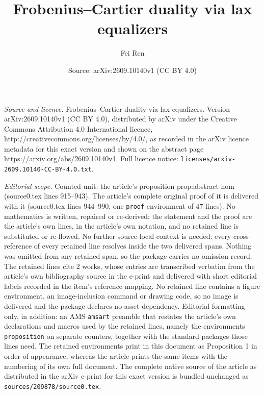 \documentclass[10pt,a4paper]{amsart}
\title{Frobenius--Cartier duality via lax equalizers}
\author{Fei Ren}
\date{Source: arXiv:2609.10140v1 (CC BY 4.0)}
\begin{document}
\maketitle

\noindent\emph{Source and licence.} Frobenius--Cartier duality via lax equalizers. Version arXiv:2609.10140v1 (CC BY 4.0), distributed by arXiv under the Creative Commons Attribution 4.0 International licence, http://creativecommons.org/licenses/by/4.0/, as recorded in the arXiv licence metadata for this exact version and shown on the abstract page https://arxiv.org/abs/2609.10140v1. Full licence notice: \texttt{licenses/arxiv-2609.10140-CC-BY-4.0.txt}.\par\smallskip

\noindent\textit{Editorial scope.} Counted unit: the article's proposition prop:abstract-hom (source0.tex lines 915--943). The article's complete original proof of it is delivered with it (source0.tex lines 944--990, one \texttt{proof} environment of 47 lines). No mathematics is written, repaired or re-derived: the statement and the proof are the article's own lines, in the article's own notation, and no retained line is substituted or re-flowed.  No further source-local context is needed: every cross-reference of every retained line resolves inside the two delivered spans.  Nothing was omitted from any retained span, so the package carries no omission record.  The retained lines cite 2 works, whose entries are transcribed verbatim from the article's own bibliography source in the e-print and delivered with short editorial labels recorded in the item's reference mapping.  No retained line contains a figure environment, an image-inclusion command or drawing code, so no image is delivered and the package declares no asset dependency.  Editorial formatting only, in addition: an AMS \texttt{amsart} preamble that restates the article's own declarations and macros used by the retained lines, namely the environments \texttt{proposition} on separate counters, together with the standard packages those lines need.  The retained environments print in this document as Proposition 1 in order of appearance, whereas the article prints the same items with the numbering of its own full document.  The complete native source of the article as distributed in the arXiv e-print for this exact version is bundled unchanged as \texttt{sources/209878/source0.tex}.
\end{document}

